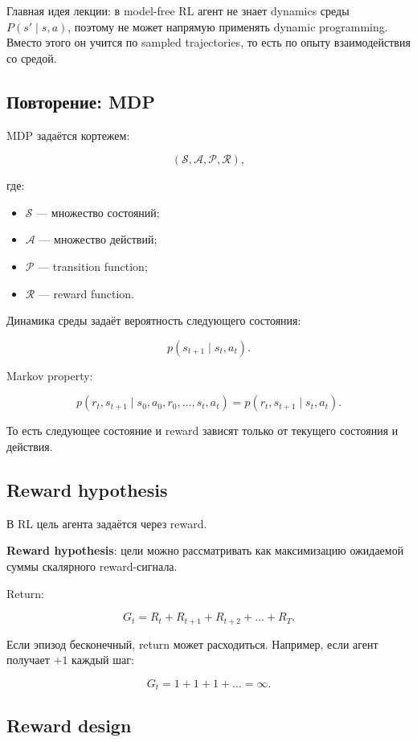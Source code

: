 \documentclass[a4paper,12pt]{article}
\begin{document}
Главная идея лекции: в model-free RL агент не знает dynamics среды \(P(s' \mid s,a)\), поэтому не может напрямую применять dynamic programming. Вместо этого он учится по sampled trajectories, то есть по опыту взаимодействия со средой.

\subsection{Повторение: MDP}

MDP задаётся кортежем:

\[
(\mathcal{S}, \mathcal{A}, \mathcal{P}, \mathcal{R}),
\]

где:

\begin{itemize}
    \item \(\mathcal{S}\) --- множество состояний;
    \item \(\mathcal{A}\) --- множество действий;
    \item \(\mathcal{P}\) --- transition function;
    \item \(\mathcal{R}\) --- reward function.
\end{itemize}

Динамика среды задаёт вероятность следующего состояния:

\[
p(s_{t+1} \mid s_t, a_t).
\]

Markov property:

\[
p(r_t, s_{t+1} \mid s_0,a_0,r_0,\dots,s_t,a_t)
=
p(r_t, s_{t+1} \mid s_t,a_t).
\]

То есть следующее состояние и reward зависят только от текущего состояния и действия.

\subsection{Reward hypothesis}

В RL цель агента задаётся через reward.

\textbf{Reward hypothesis}: цели можно рассматривать как максимизацию ожидаемой суммы скалярного reward-сигнала.

Return:

\[
G_t
=
R_t + R_{t+1} + R_{t+2} + \dots + R_T.
\]

Если эпизод бесконечный, return может расходиться. Например, если агент получает \(+1\) каждый шаг:

\[
G_t = 1 + 1 + 1 + \dots = \infty.
\]

\subsection{Reward design}
\end{document}
